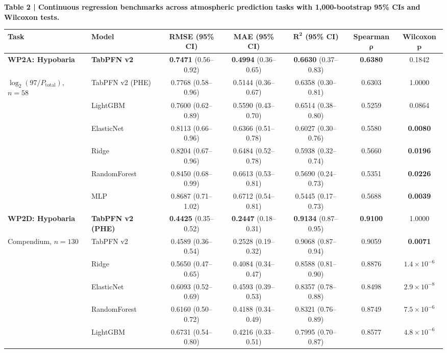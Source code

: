 \documentclass[10pt,a4paper]{article}
\begin{document}
\begin{center}
\small
\textbf{\textsf{Table 2 \;|\; Continuous regression benchmarks across atmospheric prediction tasks with 1,000-bootstrap 95\% CIs and Wilcoxon tests.}}\\[6pt]
\begin{tabular}{llccccc}
\toprule
\textbf{Task} & \textbf{Model} & \textbf{RMSE} (95\% CI) & \textbf{MAE} (95\% CI) & $\boldsymbol{R^2}$ (95\% CI) & \textbf{Spearman} $\boldsymbol{\rho}$ & \textbf{Wilcoxon} $\boldsymbol{p}$ \\
\midrule
\textbf{WP2A: Hypobaria} & \textbf{TabPFN v2} & \textbf{0.7471} (0.56--0.92) & \textbf{0.4994} (0.36--0.65) & \textbf{0.6630} (0.37--0.83) & \textbf{0.6380} & 0.1842 \\
$\log_2(97/P_{\text{total}})$, $n=58$ & TabPFN v2 (PHE) & 0.7768 (0.58--0.96) & 0.5144 (0.36--0.67) & 0.6358 (0.30--0.81) & 0.6303 & 1.0000 \\
& LightGBM & 0.7600 (0.62--0.89) & 0.5590 (0.43--0.70) & 0.6514 (0.38--0.80) & 0.5259 & 0.0864 \\
& ElasticNet & 0.8113 (0.66--0.96) & 0.6366 (0.51--0.78) & 0.6027 (0.30--0.76) & 0.5580 & \textbf{0.0080} \\
& Ridge & 0.8204 (0.67--0.96) & 0.6484 (0.52--0.78) & 0.5938 (0.32--0.74) & 0.5660 & \textbf{0.0196} \\
& RandomForest & 0.8450 (0.68--0.99) & 0.6613 (0.53--0.81) & 0.5690 (0.24--0.73) & 0.5351 & \textbf{0.0226} \\
& MLP & 0.8687 (0.71--1.02) & 0.6712 (0.54--0.81) & 0.5445 (0.17--0.73) & 0.5688 & \textbf{0.0039} \\
\midrule
\textbf{WP2D: Hypobaria} & \textbf{TabPFN v2 (PHE)} & \textbf{0.4425} (0.35--0.52) & \textbf{0.2447} (0.18--0.31) & \textbf{0.9134} (0.87--0.95) & \textbf{0.9100} & 1.0000 \\
Compendium, $n=130$ & TabPFN v2 & 0.4589 (0.36--0.54) & 0.2528 (0.19--0.32) & 0.9068 (0.87--0.94) & 0.9059 & \textbf{0.0071} \\
& Ridge & 0.5650 (0.47--0.65) & 0.4084 (0.34--0.47) & 0.8588 (0.81--0.90) & 0.8876 & \textbf{$1.4 \times 10^{-6}$} \\
& ElasticNet & 0.6093 (0.52--0.69) & 0.4593 (0.39--0.53) & 0.8357 (0.78--0.88) & 0.8498 & \textbf{$2.9 \times 10^{-8}$} \\
& RandomForest & 0.6160 (0.50--0.72) & 0.4188 (0.34--0.49) & 0.8321 (0.76--0.89) & 0.8749 & \textbf{$7.5 \times 10^{-6}$} \\
& LightGBM & 0.6731 (0.54--0.80) & 0.4216 (0.33--0.51) & 0.7995 (0.70--0.87) & 0.8577 & \textbf{$4.8 \times 10^{-6}$} \\

\end{tabular}
\end{center}
\end{document}
